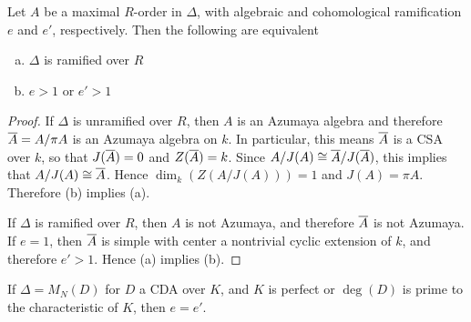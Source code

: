 \begin{prop}
Let $A$ be a maximal $R$-order in $\Delta$, with algebraic and cohomological ramification $e$ and $e'$, respectively.  Then the following are equivalent
\begin{enumerate}[(a)]
\item  $\Delta$ is ramified over $R$
\item  $e>1$ or $e'>1$
\end{enumerate}
\end{prop}
\begin{proof}
If $\Delta$ is unramified over $R$, then $A$ is an Azumaya algebra and therefore $\overline{A} = A/\pi A$ is an Azumaya algebra on $k$.  In particular, this means $\overline{A}$ is a CSA over $k$, so that $J(\overline{A}) = 0$ and $Z(\overline{A}) = k$.  Since $A/J(A)\cong \overline{A}/J(\overline{A})$, this implies that $A/J(A)\cong \overline{A}$.  Hence $\dim_k(Z(A/J(A))) = 1$ and $J(A) = \pi A$.  Therefore (b) implies (a).

If $\Delta$ is ramified over $R$, then $A$ is not Azumaya, and therefore $\overline{A}$ is not Azumaya.  If $e = 1$, then $\overline{A}$ is simple with center a nontrivial cyclic extension of $k$, and therefore $e'>1$.  Hence (a) implies (b).
\end{proof}

\begin{lem}
If $\Delta = M_N(D)$ for $D$ a CDA over $K$, and $K$ is perfect or $\deg(D)$ is prime to the characteristic of $K$, then $e = e'$.
\end{lem}


